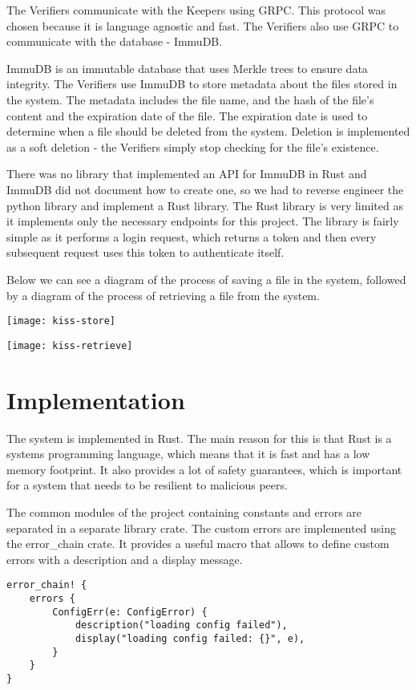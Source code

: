 \documentclass[ twoside,openright,titlepage,numbers=noenddot,headinclude,%
                footinclude=true,cleardoublepage=empty,abstractoff, %
                BCOR=5mm,paper=a4,fontsize=11pt,%
                ngerman,american,%
                ]{scrreprt}
\begin{document}
The Verifiers communicate with the Keepers using GRPC.
This protocol was chosen because it is language agnostic and fast.
The Verifiers also use GRPC to communicate with the database - ImmuDB.

ImmuDB is an immutable database that uses Merkle trees to ensure data integrity.
The Verifiers use ImmuDB to store metadata about the files stored in the system.
The metadata includes the file name, and the hash of the file's content and the expiration date of the file.
The expiration date is used to determine when a file should be deleted from the system.
Deletion is implemented as a soft deletion - the Verifiers simply stop checking for the file's existence.

There was no library that implemented an API for ImmuDB in Rust and ImmuDB did not document how to create one,
so we had to reverse engineer the python library and implement a Rust library.
The Rust library is very limited as it implements only the necessary endpoints for this project.
The library is fairly simple as it performs a login request, which returns a token and then every
subsequent request uses this token to authenticate itself.

Below we can see a diagram of the process of saving a file in the system,
followed by a diagram of the process of retrieving a file from the system.

\texttt{[image: kiss-store]}

\texttt{[image: kiss-retrieve]}


\section{Implementation}
\label{sec:implementation}

The system is implemented in Rust.
The main reason for this is that Rust is a systems programming language,
which means that it is fast and has a low memory footprint.
It also provides a lot of safety guarantees,
which is important for a system that needs to be resilient to malicious peers.

The common modules of the project containing constants and errors are separated in a separate library crate.
The custom errors are implemented using the error\_chain crate.
It provides a useful macro that allows to define custom errors with a description and a display message.
\begin{verbatim}
error_chain! {
    errors {
        ConfigErr(e: ConfigError) {
            description("loading config failed"),
            display("loading config failed: {}", e),
        }
    }
}
\end{verbatim}
\end{document}
